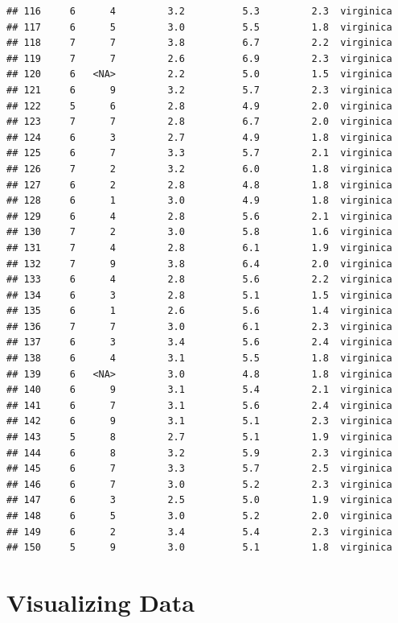 \documentclass[]{book}
\theoremstyle{definition}
\theoremstyle{definition}
\theoremstyle{definition}
\theoremstyle{remark}
\begin{document}
\begin{verbatim}
## 116     6      4         3.2          5.3         2.3  virginica
## 117     6      5         3.0          5.5         1.8  virginica
## 118     7      7         3.8          6.7         2.2  virginica
## 119     7      7         2.6          6.9         2.3  virginica
## 120     6   <NA>         2.2          5.0         1.5  virginica
## 121     6      9         3.2          5.7         2.3  virginica
## 122     5      6         2.8          4.9         2.0  virginica
## 123     7      7         2.8          6.7         2.0  virginica
## 124     6      3         2.7          4.9         1.8  virginica
## 125     6      7         3.3          5.7         2.1  virginica
## 126     7      2         3.2          6.0         1.8  virginica
## 127     6      2         2.8          4.8         1.8  virginica
## 128     6      1         3.0          4.9         1.8  virginica
## 129     6      4         2.8          5.6         2.1  virginica
## 130     7      2         3.0          5.8         1.6  virginica
## 131     7      4         2.8          6.1         1.9  virginica
## 132     7      9         3.8          6.4         2.0  virginica
## 133     6      4         2.8          5.6         2.2  virginica
## 134     6      3         2.8          5.1         1.5  virginica
## 135     6      1         2.6          5.6         1.4  virginica
## 136     7      7         3.0          6.1         2.3  virginica
## 137     6      3         3.4          5.6         2.4  virginica
## 138     6      4         3.1          5.5         1.8  virginica
## 139     6   <NA>         3.0          4.8         1.8  virginica
## 140     6      9         3.1          5.4         2.1  virginica
## 141     6      7         3.1          5.6         2.4  virginica
## 142     6      9         3.1          5.1         2.3  virginica
## 143     5      8         2.7          5.1         1.9  virginica
## 144     6      8         3.2          5.9         2.3  virginica
## 145     6      7         3.3          5.7         2.5  virginica
## 146     6      7         3.0          5.2         2.3  virginica
## 147     6      3         2.5          5.0         1.9  virginica
## 148     6      5         3.0          5.2         2.0  virginica
## 149     6      2         3.4          5.4         2.3  virginica
## 150     5      9         3.0          5.1         1.8  virginica
\end{verbatim}

\chapter{Visualizing Data}\label{visualizing-data}
\end{document}

